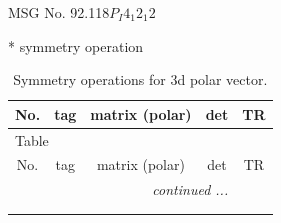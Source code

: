 \documentclass[fleqn,8pt]{jsarticle}
\begin{document}
\setcounter{MaxMatrixCols}{32}

\renewcommand{\tablename}{Table~}
\renewcommand{\figurename}{Figure~}
\begin{center}
\LARGE
MSG No. 92.118\quad$P_{I}4_{1}2_{1}2$
\end{center}
* symmetry operation
\renewcommand{\arraystretch}{1.3}
\begin{longtable}{ccccc}
\caption{Symmetry operations for 3d polar vector.}
 \\
 \hline \hline
No. & tag & matrix (polar) & det & TR \\ \hline \endfirsthead

\multicolumn{4}{l}{\tablename\ \thetable{}} \\
 \hline \hline
No. & tag & matrix (polar) & det & TR \\ \hline \endhead

 \hline \hline
\multicolumn{4}{r}{\footnotesize\it continued ...} \\ \endfoot

 \hline \hline
\multicolumn{4}{r}{} \\ \endlastfoot


\end{longtable}
\end{document}
